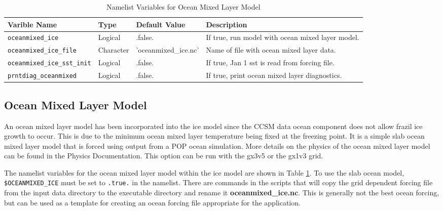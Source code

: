 \begin{table}
  \begin{center}
  \caption{Namelist Variables for Ocean Mixed Layer Model}
  \label{table:nml_ocn}
  \begin{tabular}{p{4cm}p{2.0cm}p{3cm}p{5.5cm}} \hline
  Varible Name & Type & Default Value & Description               \\

  \hline \hline

{\tt oceanmixed\_ice} &  Logical  & .false.  &  If true, run model with
                                            ocean mixed layer model.  \\

{\tt oceanmixed\_ice\_file} &  Character & \scriptsize{'oceanmixed\_ice.nc'}  &  Name of
                                        file with ocean mixed layer data.  \\

{\tt \scriptsize{oceanmixed\_ice\_sst\_init}} &  Logical & .false.  &  If true, 
                             Jan 1 sst is read from forcing file.  \\

{\tt prntdiag\_oceanmixed} &  Logical & .false.  &  If true, print ocean
                                                mixed layer diagnostics.  \\

  \hline
  \end{tabular}
  \end{center}
\end{table}

\subsection{Ocean Mixed Layer Model}

An ocean mixed layer model has been incorporated into the ice model since
the CCSM data ocean component does not allow frazil ice growth to occur.
This is due to the minimum ocean mixed layer temperature being fixed at the
freezing point.  It is a simple slab ocean mixed layer model that is forced
using output from a POP ocean simulation.  More details on the physics of the
ocean mixed layer model can be found in the Physics Documentation.  This
option can be run with the gx3v5 or the gx1v3 grid. 

The namelist variables for the ocean mixed layer model within the ice model
are shown in Table \ref{table:nml_ocn}.  To use the slab ocean model,
{\tt \$OCEANMIXED\_ICE} must be set to {\tt .true.} in the namelist.
There are commands in the scripts that will copy the grid dependent forcing
file from the input data directory to the executable directory and rename it
{\bf oceanmixed\_ice.nc}.  This is generally not the best ocean forcing, but
can be used as a template for creating an ocean forcing file appropriate
for the application.

